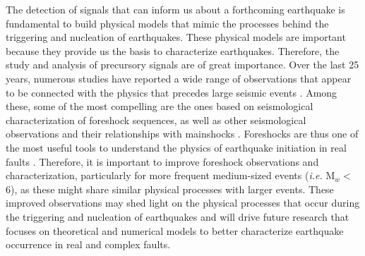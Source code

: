 \documentclass[a4paper,12pt,twoside]{article}
\begin{document}
The detection of signals that can inform us about a forthcoming earthquake is fundamental to build physical models that mimic the processes behind the triggering and nucleation of earthquakes. These physical models are important because they provide us the basis to characterize earthquakes. Therefore, the study and analysis of precursory signals are of great importance. Over the last 25 years, numerous studies have reported a wide range of observations that appear to be connected with the physics that precedes large seismic events \citep[\emph{e.g.}][]{Rikitake_1975_EP, Jones_1979_SCF, Molchanov_1998_PES, Eftaxias_2000_DEE, Virk_2001_HRP, Singh_2010_PSU, DeSantins_2019_PWS, Jones_1985_FTE, Abercrombie_1996_OPF, Felzer_2004_COA, Dodge_1996_DOC, Ellsworth_2018_NIE, Yoon_2019_FMN, Reasenberg_1999_FOB, ruiz2017nucleation, ruiz2014intense}. Among these, some of the most compelling are the ones based on seismological characterization of foreshock sequences, as well as other seismological observations and their relationships with mainshocks \citep[\emph{e.g.}][]{Jones_1985_FTE, Abercrombie_1996_OPF, Reasenberg_1999_FOB, Felzer_2004_COA, Dodge_1996_DOC, Bouchon_2011_ENI, Ruiz_2014_IFS, ruiz2017nucleation, Ellsworth_2018_NIE, Yoon_2019_FMN}. Foreshocks are thus one of the most useful tools to understand the physics of earthquake initiation in real faults \citep{Brune_1979_IET, Abercrombie_1996_OPF, Malin_2018_MPE}. Therefore, it is important to improve foreshock observations and characterization, particularly for more frequent medium-sized events (\emph{i.e.} M$_w <$ 6), as these might share similar physical processes with larger events. These improved observations may shed light on the physical processes that occur during the triggering and nucleation of earthquakes and will drive future research that focuses on theoretical and numerical models to better characterize earthquake occurrence in real and complex faults. 
\end{document}

